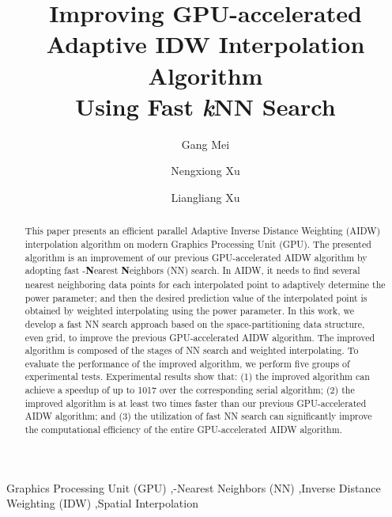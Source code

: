 \documentclass[final,5p,times,twocolumn,authoryear]{elsarticle}
\begin{document}
\begin{frontmatter}






\title{Improving GPU-accelerated Adaptive IDW Interpolation Algorithm \\Using 
	   Fast \textit{k}NN Search}



\author[myaddress]{Gang Mei}
\author[myaddress]{Nengxiong Xu}
\author[myaddress]{Liangliang Xu}
\address[myaddress]{School of Engineering and Technology, China University of Geosciences, Beijing 100083, China}


\begin{abstract}
This paper presents an efficient parallel Adaptive Inverse Distance 
Weighting (AIDW) interpolation algorithm on modern Graphics Processing Unit 
(GPU). The presented algorithm is an improvement of our previous 
GPU-accelerated AIDW algorithm by adopting fast -\textbf{N}earest 
\textbf{N}eighbors (NN) search. In AIDW, it needs to find several nearest 
neighboring data points for each interpolated point to adaptively determine 
the power parameter; and then the desired prediction value of the interpolated point 
is obtained by weighted interpolating using the power parameter. In this 
work, we develop a fast NN search approach based on the space-partitioning 
data structure, even grid, to improve the previous GPU-accelerated AIDW algorithm. 
The improved algorithm is composed of the stages of NN search and weighted 
interpolating. To evaluate the performance of the improved algorithm, we 
perform five groups of experimental tests. Experimental results show that: 
(1) the improved algorithm can achieve a speedup of up to 1017 over the 
corresponding serial algorithm; (2) the improved algorithm is at least two 
times faster than our previous GPU-accelerated AIDW algorithm; and (3) the utilization 
of fast NN search can significantly improve the computational efficiency of 
the entire GPU-accelerated AIDW algorithm.
\end{abstract}

\begin{keyword}
Graphics Processing Unit (GPU) \sep -Nearest Neighbors 
(NN) \sep Inverse Distance Weighting (IDW) \sep Spatial Interpolation






\end{keyword}


\end{frontmatter}
\end{document}
